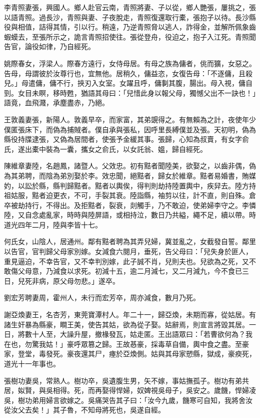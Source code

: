 \begin{pinyinscope}
李青照妻張，興國人。鄉人赴官云南，青照將妻、子以從，鄉人艷張，屢挑之，張以語青照。過長沙，青照與妻、子夜脫走，青照復還取行橐，張抱子以待。長沙縣役與相值，詰得其情，引以行。稍遠，乃逆青照脅以逃人，詐得金，並解所佩象齒蝦蟆去，至張所示之，詭言青照招使往。張從登舟，役迫之，抱子入江死。青照聞告官，論役如律，乃自經死。

姚際春女，浮梁人。際春方遠行，女侍母居。有母之族為傭者，佻而獷，女惡之。告母，母謂彼於汝尊行也，宜無他。居稍久，傭益恣，女復告母：「不逐傭，且殺兒。」母遣傭，傭不行，挾刃入女室。女躍且呼，傭剚其腹，腸出。母入視，傭自剄。女目未瞑，移時甦，猶語其母曰：「兒惜此身以報父母，獨憾父出不一訣也！」語竟，血飛濺，承塵盡赤，乃絕。

王敦義妻張，新陽人。敦義早卒，而家富，其弟覬得之。有無賴為之計，夜使年少僕匿張床下，而偽為捕賊者。僕自承與張私，因呼里長縛僕並及張。天初明，偽為縣役持牒逮張，又偽為居間者，使張予金緩其事。張歸，心知為叔賣，有女字俞氏，遂出橐中裝為一囊，攜女之俞氏，以女託翁、媼，歸自經死。

陳維章妻陸，名趙鳳，諸暨人。父效忠。初有黠者聞陸美，欲娶之，以齒非偶，偽為其弟聘，而陰為弟別娶於李。效忠聞，絕黠者，歸女於維章。黠者易婚書，賄媒妁，以訟於縣，縣判歸黠者。黠者以輿俟，得判則劫持陸置輿中，疾舁去。陸方持祖姑服，黠者迫更衣，不可，手裂其衰。陸詣縣，袖剪以往，計不直，則自殊。倉卒被劫持行，不得出。及拒黠者，裂衰，剡觸手，乃不敢迫，使弟婦李守之。李憐陸，又自念處亂家，時時與陸屏語，或相持泣，數日乃共縊，繩不足，續以帶。時道光四年二月，陸與李皆十七。

何氏女，山陰人，居通州。鄰有黠者聘為其弄兒婦，冀並亂之，女截發自誓。鄰里以告官，官判歸父母家別嫁。女減食六閱月，垂死，告父母曰：「兒失身於匪人，重見逼迫，不幸告官，又不幸判別嫁，此子誠不肖，兒則夫也。兒欲為之死，又不敢傷父母意，乃減食以求死。初減十五，逾二月減七，又二月減九，今不食已三日，兒死非病，原父母勿悲。」遂卒。

劉宏芳聘妻周，霍州人，未行而宏芳卒，周亦減食，數月乃死。

謝亞煥妻王，名杏芳，東莞寶潭村人。年二十一，歸亞煥，未期而寡，從姑居。有諸生奸暴為縣豪，瞷王美，使告其姑，欲為從子娶。姑辭焉，則宣言將毀其居。一日，將數十人至，大譟升屋，撤椽發瓦，姑走匿。王出語眾曰：「若曹欲何為？我在也，勿驚我姑！」豪呼眾篡之歸。王故惎豪，採毒草自備，輿中食之盡。至豪家，登堂，毒發死。豪夜還其尸，瘞於亞煥側。姑與其母家愬縣，獄成，豪瘐死，道光十一年事也。

張樹功妻吳，常熟人。樹功卒，吳遺腹生男，矢不嫁，事姑撫孤子。樹功有弟共居，姒賢，與吳相得。死，而再娶得悍婦，奴婢視吳母子，吳安之。歲饑，悍婦凌吳，樹功弟用婦言欲嫁之。吳痛哭告其子曰：「汝今九歲，饑寒可自知，我將舍汝從汝父去矣！」其子魯，不知母將死也，吳遂自經。


\end{pinyinscope}
